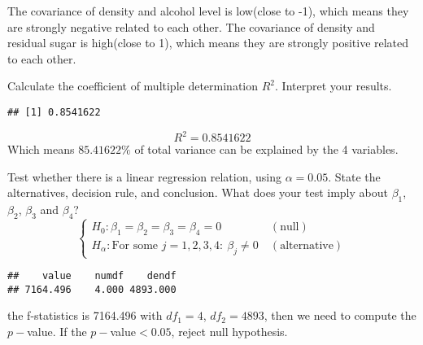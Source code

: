 \documentclass[
]{article}
\newenvironment{Shaded}{\begin{snugshade}}{\end{snugshade}}
\newcommand{\DecValTok}[1]{\textcolor[rgb]{0.00,0.00,0.81}{#1}}
\newcommand{\FunctionTok}[1]{\textcolor[rgb]{0.00,0.00,0.00}{#1}}
\newcommand{\NormalTok}[1]{#1}
\newcommand{\SpecialCharTok}[1]{\textcolor[rgb]{0.00,0.00,0.00}{#1}}
\begin{document}
The covariance of density and alcohol level is low(close to -1), which
means they are strongly negative related to each other. The covariance
of density and residual sugar is high(close to 1), which means they are
strongly positive related to each other.

Calculate the coefficient of multiple determination \(R^2\). Interpret
your results.

\begin{Shaded}
\end{Shaded}

\begin{verbatim}
## [1] 0.8541622
\end{verbatim}

\[R^2=0.8541622\] Which means \(85.41622\%\) of total variance can be
explained by the 4 variables.

Test whether there is a linear regression relation, using
\(\alpha=0.05\). State the alternatives, decision rule, and conclusion.
What does your test imply about \(\beta_1\), \(\beta_2\), \(\beta_3\)
and \(\beta_4\)? \[
\left\{\begin{array}{l}
H_{0}: \beta_{1}=\beta_2=\beta_3=\beta_4=0\ &(\text{null})\\
H_{\alpha}:\text{For some }j=1,2,3,4:\ \beta_{j} \neq 0\ &(\text{alternative})
\end{array}\right.
\]

\begin{Shaded}
\end{Shaded}

\begin{verbatim}
##    value    numdf    dendf 
## 7164.496    4.000 4893.000
\end{verbatim}

the f-statistics is 7164.496 with \({df}_1=4\), \({df}_2=4893\), then we
need to compute the \(p-\)value. If the \(p-\)value\(<0.05\), reject
null hypothesis.

\begin{Shaded}
\end{Shaded}
\end{document}

